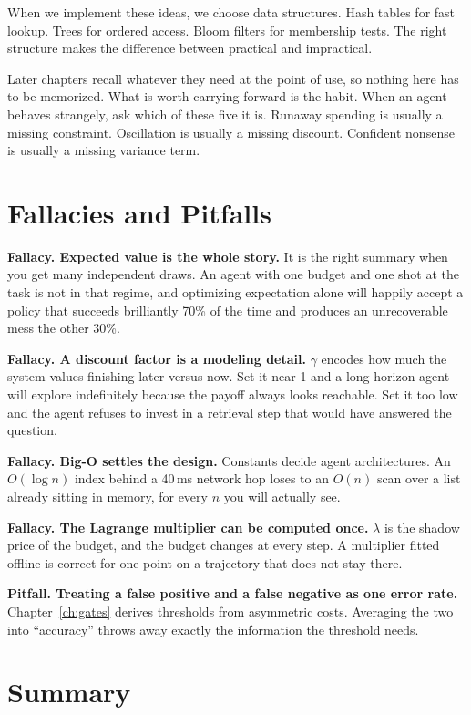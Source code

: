 When we implement these ideas, we choose data structures. Hash tables for fast lookup. Trees for ordered access. Bloom filters for membership tests. The right structure makes the difference between practical and impractical.

Later chapters recall whatever they need at the point of use, so nothing here has to be memorized. What is worth carrying forward is the habit. When an agent behaves strangely, ask which of these five it is. Runaway spending is usually a missing constraint. Oscillation is usually a missing discount. Confident nonsense is usually a missing variance term.

\section{Fallacies and Pitfalls}

\textbf{Fallacy. Expected value is the whole story.} It is the right summary when
you get many independent draws. An agent with one budget and one shot at the task
is not in that regime, and optimizing expectation alone will happily accept a
policy that succeeds brilliantly 70\% of the time and produces an unrecoverable
mess the other 30\%.

\textbf{Fallacy. A discount factor is a modeling detail.} $\gamma$ encodes how
much the system values finishing later versus now. Set it near 1 and a
long-horizon agent will explore indefinitely because the payoff always looks
reachable. Set it too low and the agent refuses to invest in a retrieval step that
would have answered the question.

\textbf{Fallacy. Big-O settles the design.} Constants decide agent architectures.
An $O(\log n)$ index behind a 40\,ms network hop loses to an $O(n)$ scan over a
list already sitting in memory, for every $n$ you will actually see.

\textbf{Fallacy. The Lagrange multiplier can be computed once.} $\lambda$ is the
shadow price of the budget, and the budget changes at every step. A multiplier
fitted offline is correct for one point on a trajectory that does not stay there.

\textbf{Pitfall. Treating a false positive and a false negative as one error rate.}
Chapter~\ref{ch:gates} derives thresholds from asymmetric costs. Averaging the two
into ``accuracy'' throws away exactly the information the threshold needs.

\section{Summary}

